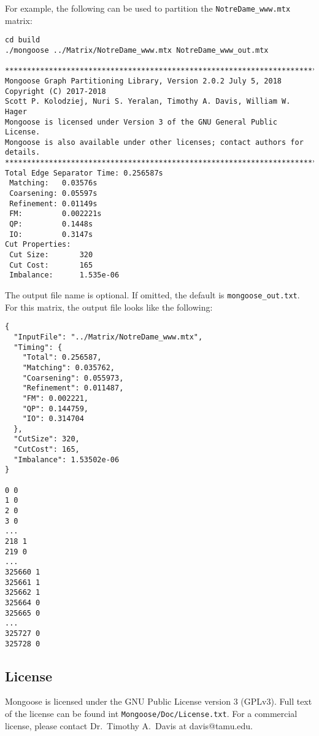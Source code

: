 \documentclass[letter]{article}
\begin{document}
For example, the following can be used to partition the \texttt{NotreDame\_www.mtx} matrix:

\begin{lstlisting}[numbers=none,xleftmargin=.09\textwidth, xrightmargin=.09\textwidth,keywordstyle=\color{black}]
cd build
./mongoose ../Matrix/NotreDame_www.mtx NotreDame_www_out.mtx

********************************************************************************
Mongoose Graph Partitioning Library, Version 2.0.2 July 5, 2018
Copyright (C) 2017-2018
Scott P. Kolodziej, Nuri S. Yeralan, Timothy A. Davis, William W. Hager
Mongoose is licensed under Version 3 of the GNU General Public License.
Mongoose is also available under other licenses; contact authors for details.
********************************************************************************
Total Edge Separator Time: 0.256587s
 Matching:   0.03576s
 Coarsening: 0.05597s
 Refinement: 0.01149s
 FM:         0.002221s
 QP:         0.1448s
 IO:         0.3147s
Cut Properties:
 Cut Size:       320
 Cut Cost:       165
 Imbalance:      1.535e-06
\end{lstlisting}

The output file name is optional. If omitted, the default is \texttt{mongoose\_out.txt}.
For this matrix, the output file looks like the following:

\begin{lstlisting}[numbers=none,xleftmargin=.09\textwidth, xrightmargin=.09\textwidth,keywordstyle=\color{black}]
{
  "InputFile": "../Matrix/NotreDame_www.mtx",
  "Timing": {
    "Total": 0.256587,
    "Matching": 0.035762,
    "Coarsening": 0.055973,
    "Refinement": 0.011487,
    "FM": 0.002221,
    "QP": 0.144759,
    "IO": 0.314704
  },
  "CutSize": 320,
  "CutCost": 165,
  "Imbalance": 1.53502e-06
}

0 0
1 0
2 0
3 0
...
218 1
219 0
...
325660 1
325661 1
325662 1
325664 0
325665 0
...
325727 0
325728 0

\end{lstlisting}

\subsection{License}

Mongoose is licensed under the GNU Public License version 3 (GPLv3). Full text of the license can be found int \texttt{Mongoose/Doc/License.txt}. For a commercial license, please contact Dr.~Timothy A.~Davis at davis@tamu.edu.
\end{document}
